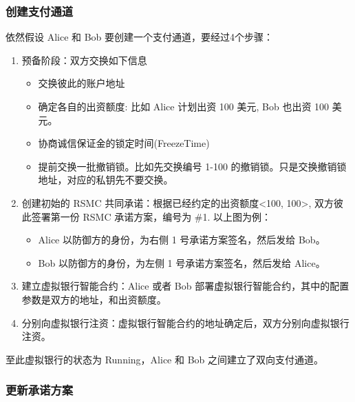 \subsubsection{创建支付通道}
依然假设 Alice 和 Bob 要创建一个支付通道，要经过4个步骤：
\begin{enumerate}
    \item 预备阶段：双方交换如下信息
        \begin{itemize}
            \item 交换彼此的账户地址 
            \item 确定各自的出资额度: 比如 Alice 计划出资 100 美元, Bob 也出资 100 美元。
            \item 协商诚信保证金的锁定时间(FreezeTime)
            \item 提前交换一批撤销锁。比如先交换编号 1-100 的撤销锁。只是交换撤销锁地址，对应的私钥先不要交换。
        \end{itemize}
    
    \item 创建初始的 RSMC 共同承诺：根据已经约定的出资额度<100, 100>, 双方彼此签署第一份 RSMC 承诺方案，编号为 \#1. 以上图为例：
        \begin{itemize}
        \item Alice 以防御方的身份，为右侧 1 号承诺方案签名，然后发给 Bob。
        \item Bob 以防御方的身份，为左侧 1 号承诺方案签名，然后发给 Alice。
        \end{itemize}

    \item 建立虚拟银行智能合约：Alice 或者 Bob 部署虚拟银行智能合约，其中的配置参数是双方的地址，和出资额度。
    \item 分别向虚拟银行注资：虚拟银行智能合约的地址确定后，双方分别向虚拟银行注资。
\end{enumerate}


至此虚拟银行的状态为 Running，Alice 和 Bob 之间建立了双向支付通道。

\subsubsection{更新承诺方案}

